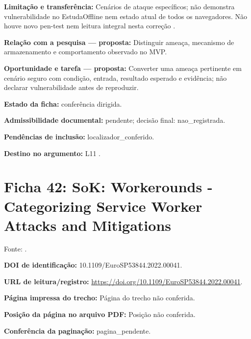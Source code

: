\noindent\textbf{Limitação e transferência:} Cenários de ataque específicos; não demonstra vulnerabilidade no EstudaOffline nem estado atual de todos os navegadores. Não houve novo pen-test nem leitura integral nesta correção \citep{OS01}.\par\medskip

\noindent\textbf{Relação com a pesquisa — proposta:} Distinguir ameaça, mecanismo de armazenamento e comportamento observado no MVP.\par\medskip

\noindent\textbf{Oportunidade e tarefa — proposta:} Converter uma ameaça pertinente em cenário seguro com condição, entrada, resultado esperado e evidência; não declarar vulnerabilidade antes de reproduzir.\par\medskip

\noindent\textbf{Estado da ficha:} conferência dirigida.\par\medskip

\noindent\textbf{Admissibilidade documental:} pendente; decisão final: nao\_registrada.\par\medskip

\noindent\textbf{Pendências de inclusão:} localizador\_conferido.\par\medskip

\noindent\textbf{Destino no argumento:} L11 .

\clearpage\section*{Ficha 42: SoK: Workerounds - Categorizing Service Worker Attacks and Mitigations}

Fonte: \citet{OS02}.

\noindent\textbf{DOI de identificação:} 10.1109/EuroSP53844.2022.00041.\par\medskip

\noindent\textbf{URL de leitura/registro:} \url{https://doi.org/10.1109/EuroSP53844.2022.00041}.\par\medskip

\noindent\textbf{Página impressa do trecho:} Página do trecho não conferida.\par\medskip

\noindent\textbf{Posição da página no arquivo PDF:} Posição não conferida.\par\medskip

\noindent\textbf{Conferência da paginação:} pagina\_pendente.\par\medskip

